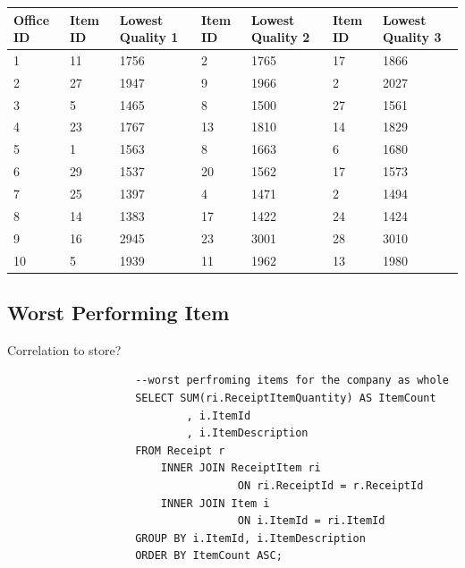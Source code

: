 \documentclass{article}
\begin{document}
            \begin{table}[H]
                \centering
                \begin{tabular}{|l|l|l|l|l|l|l|}
                \hline
                Office ID & Item ID & Lowest Quality 1 & Item ID & Lowest Quality 2 & Item ID & Lowest Quality 3  \\ \hline
                1         & 11      & 1756             & 2       & 1765             & 17      & 1866              \\ \hline
                2         & 27      & 1947             & 9       & 1966             & 2       & 2027              \\ \hline
                3         & 5       & 1465             & 8       & 1500             & 27      & 1561              \\ \hline
                4         & 23      & 1767             & 13      & 1810             & 14      & 1829              \\ \hline
                5         & 1       & 1563             & 8       & 1663             & 6       & 1680              \\ \hline
                6         & 29      & 1537             & 20      & 1562             & 17      & 1573              \\ \hline
                7         & 25      & 1397             & 4       & 1471             & 2       & 1494              \\ \hline
                8         & 14      & 1383             & 17      & 1422             & 24      & 1424              \\ \hline
                9         & 16      & 2945             & 23      & 3001             & 28      & 3010              \\ \hline
                10        & 5       & 1939             & 11      & 1962             & 13      & 1980              \\ \hline
                \end{tabular}
                \end{table}

            \subsection{Worst Performing Item}
                Correlation to store?

                \begin{lstlisting}
                    --worst perfroming items for the company as whole
                    SELECT SUM(ri.ReceiptItemQuantity) AS ItemCount
                            , i.ItemId
                            , i.ItemDescription
                    FROM Receipt r
                        INNER JOIN ReceiptItem ri
                                    ON ri.ReceiptId = r.ReceiptId
                        INNER JOIN Item i
                                    ON i.ItemId = ri.ItemId
                    GROUP BY i.ItemId, i.ItemDescription
                    ORDER BY ItemCount ASC;
                \end{lstlisting}
\end{document}
